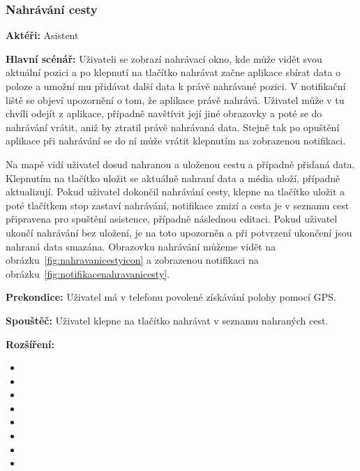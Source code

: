 \documentclass[czech,master,public,dept460,male,java,cpdeclaration]{diploma}
\newcommand{\usecase}[2]{\subsubsection{#1}\label{#2}}
\begin{document}
\usecase{Nahrávání cesty}{nahravanicesty}
\textbf{Aktéři:} Asistent

\vspace{0.1cm}
\noindent
\textbf{Hlavní scénář:} Uživateli se zobrazí nahrávací okno, kde může vidět svou aktuální pozici
a po klepnutí na tlačítko nahrávat začne aplikace sbírat data o poloze a umožní mu přidávat další data
k právě nahrávané pozici. V notifikační liště se objeví upozornění o tom, že aplikace právě nahrává.
Uživatel může v tu chvíli odejít z aplikace, případně navštívit její jiné obrazovky a poté se do nahrávání vrátit,
aniž by ztratil právě nahrávaná data. Stejně tak po opuštění aplikace při nahrávání se do ní může vrátit
klepnutím na zobrazenou notifikaci.

Na mapě vidí uživatel dosud nahranou a uloženou cestu a případně přidaná data.
Klepnutím na tlačítko uložit se aktuálně nahraní data a média uloží, případně aktualizují.
Pokud uživatel dokončil nahrávání cesty, klepne na tlačítko uložit a poté tlačítkem stop zastaví nahrávání,
notifikace zmizí a cesta je v seznamu cest připravena pro spuštění asistence, případně následnou editaci.
Pokud uživatel ukončí nahrávání bez uložení, je na toto upozorněn a při potvrzení ukončení jsou nahraná data
smazána. Obrazovku nahrávání můžeme vidět na obrázku~\ref{fig:nahravanicestyicon} a zobrazenou notifikaci
na obrázku~\ref{fig:notifikacenahravanicesty}.

\vspace{0.1cm}
\noindent
\textbf{Prekondice:} Uživatel má v telefonu povolené získávání polohy pomocí GPS.

\vspace{0.1cm}
\noindent
\textbf{Spouštěč:} Uživatel klepne na tlačítko nahrávat v seznamu nahraných cest.

\vspace{0.1cm}
\noindent
\textbf{Rozšíření:}
\begin{itemize}
  \item {}
  \item {}
  \item {}
  \item {}
  \item {}
  \item {}
  \item {}
  \item {}
\end{itemize}
\end{document}
